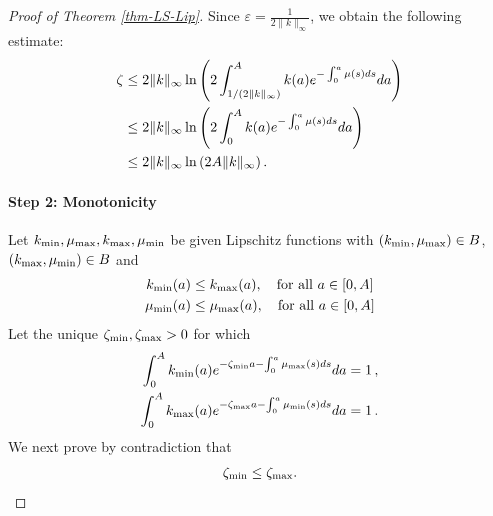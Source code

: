 \documentclass[journal,twoside,web]{ieeecolor}
\begin{document}
\begin{proof}[Proof of Theorem \ref{thm-LS-Lip}]
Since $\varepsilon = \frac{1}{2 \| k \|_\infty}$, we obtain the following estimate:
\begin{align}
\zeta &\le 2 \| k \|_\infty 
\ln \left( 
2 \int_{1/(2\|k\|_\infty)}^{A} k(a) e^{-\int_0^a \mu(s)   ds}  da \right) \notag  \\
&\le 2 \| k \|_\infty 
\ln \left( 2 \int_{0}^{A} k(a) e^{-\int_0^a \mu(s)   ds}  da \right) \notag \\
&\le 2 \| k \|_\infty \ln \left( 2 A \| k \|_\infty \right).\label{eq:zeta_estimate2}
\end{align}

\paragraph*{Step 2: Monotonicity}
Let $k_{\rm min}, \mu_{\rm max}, k_{\rm max}, \mu_{\rm min}$ be given Lipschitz functions with 
$(k_{\rm min}, \mu_{\rm max}) \in B$, $(k_{\rm max}, \mu_{\rm min}) \in B$ and
\begin{align}
k_{\rm min}(a) &\le k_{\rm max}(a), \quad \text{for all } a \in [0,A] \\
\mu_{\rm min}(a) &\le \mu_{\rm max}(a), \quad \text{for all } a \in [0,A]
\end{align}
Let the unique $\zeta_{\rm min}, \zeta_{\rm max} > 0$ for which 
\begin{align}
    \int_0^A k_{\rm min}(a)e^{-\zeta_{\rm min} a - \int_0^a \mu_{\rm max}(s) ds }da =&\; 1\,, \\
     \int_0^A k_{\rm max}(a)e^{-\zeta_{\rm max} a - \int_0^a \mu_{\rm min}(s) ds }da =&\; 1\,.
\end{align}
We next prove by contradiction that
\begin{align}
\zeta_{\rm min} \le \zeta_{\rm max}.
\end{align}


\end{proof}
\end{document}
